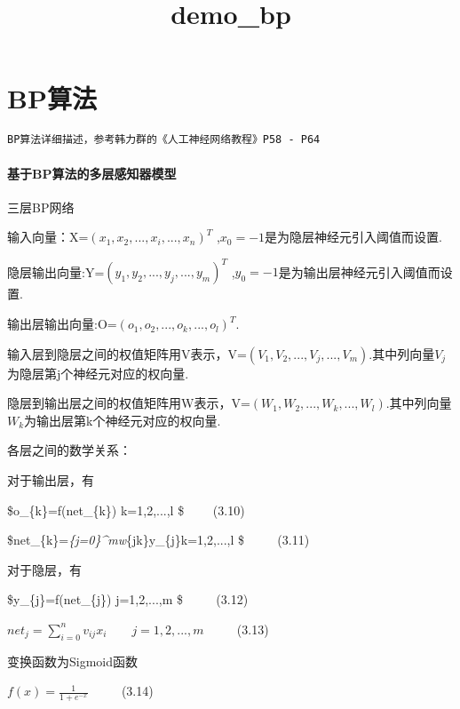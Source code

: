 \documentclass[11pt]{article}
\title{demo\_bp}
\begin{document}
    
    
    \maketitle
    
    

    
    \section{BP算法}\label{bpux7b97ux6cd5}

\begin{verbatim}
BP算法详细描述，参考韩力群的《人工神经网络教程》P58 - P64
\end{verbatim}

\paragraph{基于BP算法的多层感知器模型}\label{ux57faux4e8ebpux7b97ux6cd5ux7684ux591aux5c42ux611fux77e5ux5668ux6a21ux578b}

三层BP网络

输入向量：X=\((x_{1},x_{2},...,x_{i},...,x_{n})^T\)
,\(x_{0}=-1\)是为隐层神经元引入阈值而设置.

隐层输出向量:Y=\((y_{1},y_{2},...,y_{j},...,y_{m})^T\)
,\(y_{0}=-1\)是为输出层神经元引入阈值而设置.

输出层输出向量:O=\((o_{1},o_{2},...,o_{k},...,o_{l})^T\).

输入层到隐层之间的权值矩阵用V表示，V=\((V_{1},V_{2},...,V_{j},...,V_{m})\).其中列向量\(V_{j}\)为隐层第j个神经元对应的权向量.

隐层到输出层之间的权值矩阵用W表示，V=\((W_{1},W_{2},...,W_{k},...,W_{l})\).其中列向量\(W_{k}\)为输出层第k个神经元对应的权向量.

各层之间的数学关系：

对于输出层，有

\$o\_\{k\}=f(net\_\{k\}) \qquad\qquad  k=1,2,...,l \$ \(\qquad\)(3.10)

\$net\_\{k\}=\sum\emph{\{j=0\}\^{}mw}\{jk\}y\_\{j\}\qquad  k=1,2,...,l
\$ \(\qquad\) (3.11)

对于隐层，有

\$y\_\{j\}=f(net\_\{j\}) \qquad\qquad j=1,2,...,m \$ \(\qquad\) (3.12)

\(net_{j}=\sum_{i=0}^nv_{ij}x_{i} \qquad j=1,2,...,m\) \(\qquad\) (3.13)

变换函数为Sigmoid函数

\(f(x)=\frac{1}{1+e^{-x}}\) \(\qquad\) (3.14)
\end{document}
